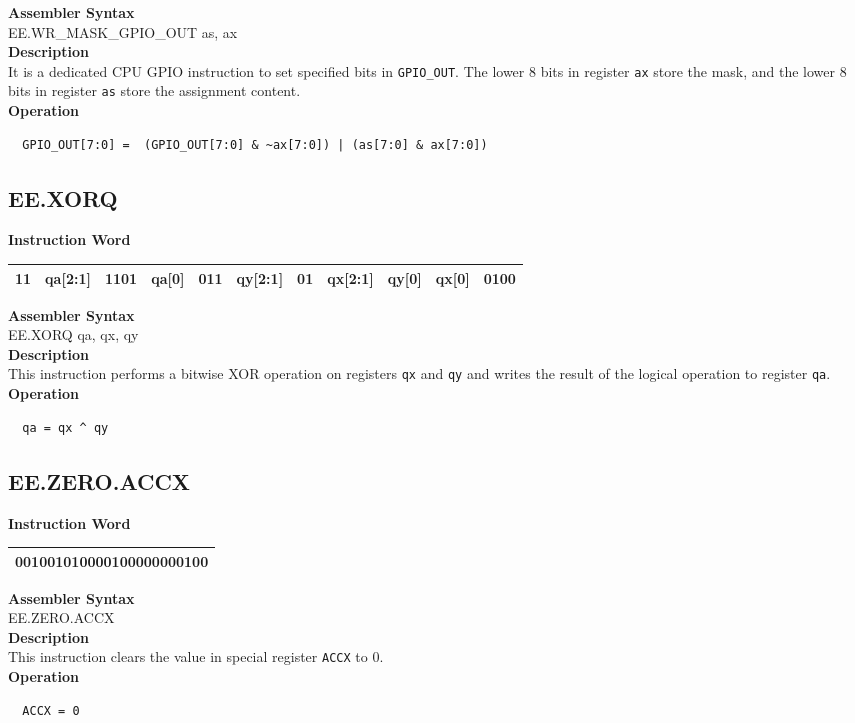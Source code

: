 \textbf{Assembler Syntax} \\
EE.WR\_MASK\_GPIO\_OUT as, ax \\
\textbf{Description} \\
It is a dedicated CPU GPIO instruction to set specified bits in \lstinline{GPIO_OUT}. The lower 8 bits in register \lstinline{ax} store the mask, and the lower 8 bits in register \lstinline{as} store the assignment content.\\
\textbf{Operation}
\begin{lstlisting}
  GPIO_OUT[7:0] =  (GPIO_OUT[7:0] & ~ax[7:0]) | (as[7:0] & ax[7:0])
\end{lstlisting}

\clearpage
\subsection{EE.XORQ}\label{instruction:EEXORQ}
\setlength\tabcolsep{6pt}
\textbf{Instruction Word} \\
\begin{tabular}{|c|c|c|c|c|c|c|c|c|c|c|}
	\hline
	11 & qa[2:1] & 1101 & qa[0] & 011 & qy[2:1] & 01 & qx[2:1] & qy[0] & qx[0] & 0100 \\
	\hline
\end{tabular}

\textbf{Assembler Syntax} \\
EE.XORQ qa, qx, qy \\
\textbf{Description} \\
This instruction performs a bitwise XOR operation on registers \lstinline{qx} and \lstinline{qy} and writes the result of the logical operation to register \lstinline{qa}.\\
\textbf{Operation}
\begin{lstlisting}
  qa = qx ^ qy
\end{lstlisting}

\clearpage
\subsection{EE.ZERO.ACCX}\label{instruction:EEZEROACCX}
\setlength\tabcolsep{6pt}
\textbf{Instruction Word} \\
\begin{tabular}{|c|}
	\hline
	001001010000100000000100 \\
	\hline
\end{tabular}

\textbf{Assembler Syntax} \\
EE.ZERO.ACCX  \\
\textbf{Description} \\
This instruction clears the value in special register \lstinline{ACCX} to 0.\\
\textbf{Operation}
\begin{lstlisting}
  ACCX = 0
\end{lstlisting}

